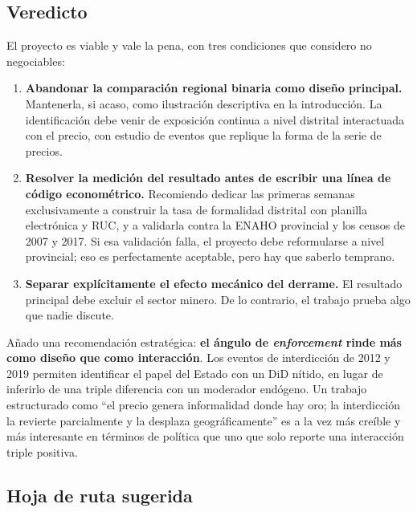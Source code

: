 \documentclass[11pt,a4paper]{article}
\begin{document}
\subsection{Veredicto}

El proyecto es viable y vale la pena, con tres condiciones que considero no negociables:

\begin{enumerate}[leftmargin=1.6em,itemsep=3pt]
\item \textbf{Abandonar la comparación regional binaria como diseño principal.} Mantenerla, si acaso, como ilustración descriptiva en la introducción. La identificación debe venir de exposición continua a nivel distrital interactuada con el precio, con estudio de eventos que replique la forma de la serie de precios.
\item \textbf{Resolver la medición del resultado antes de escribir una línea de código econométrico.} Recomiendo dedicar las primeras semanas exclusivamente a construir la tasa de formalidad distrital con planilla electrónica y RUC, y a validarla contra la ENAHO provincial y los censos de 2007 y 2017. Si esa validación falla, el proyecto debe reformularse a nivel provincial; eso es perfectamente aceptable, pero hay que saberlo temprano.
\item \textbf{Separar explícitamente el efecto mecánico del derrame.} El resultado principal debe excluir el sector minero. De lo contrario, el trabajo prueba algo que nadie discute.
\end{enumerate}

Añado una recomendación estratégica: \textbf{el ángulo de \emph{enforcement} rinde más como diseño que como interacción}. Los eventos de interdicción de 2012 y 2019 permiten identificar el papel del Estado con un DiD nítido, en lugar de inferirlo de una triple diferencia con un moderador endógeno. Un trabajo estructurado como ``el precio genera informalidad donde hay oro; la interdicción la revierte parcialmente y la desplaza geográficamente'' es a la vez más creíble y más interesante en términos de política que uno que solo reporte una interacción triple positiva.

\subsection{Hoja de ruta sugerida}
\end{document}
